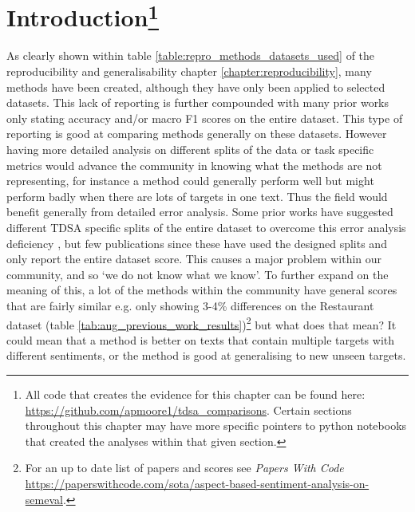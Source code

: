 \FloatBarrier
\section[Introduction]{Introduction\footnote{All code that creates the evidence for this chapter can be found here: \url{https://github.com/apmoore1/tdsa_comparisons}. Certain sections throughout this chapter may have more specific pointers to python notebooks that created the analyses within that given section.}}
\label{section:aug_introduction}
As clearly shown within table \ref{table:repro_methods_datasets_used} of the reproducibility and generalisability chapter \ref{chapter:reproducibility}, many methods have been created, although they have only been applied to selected datasets. This lack of reporting is further compounded with many prior works only stating accuracy and/or macro F1 scores on the entire dataset. This type of reporting is good at comparing methods generally on these datasets. However having more detailed analysis on different splits of the data or task specific metrics would advance the community in knowing what the methods are not representing, for instance a method could generally perform well but might perform badly when there are lots of targets in one text. Thus the field would benefit generally from detailed error analysis. Some prior works have suggested different TDSA specific splits of the entire dataset to overcome this error analysis deficiency \citep{nguyen-shirai-2015-phrasernn,wang-etal-2017-tdparse,he-etal-2018-effective,yang2018multi}, but few publications since these have used the designed splits and only report the entire dataset score. This causes a major problem within our community, and so `we do not know what we know'. To further expand on the meaning of this, a lot of the methods within the community have general scores that are fairly similar e.g. only showing 3-4\% differences on the Restaurant dataset (table \ref{tab:aug_previous_work_results})\footnote{For an up to date list of papers and scores see \textit{Papers With Code} \url{https://paperswithcode.com/sota/aspect-based-sentiment-analysis-on-semeval}.} but what does that mean? It could mean that a method is better on texts that contain multiple targets with different sentiments, or the method is good at generalising to new unseen targets. 

